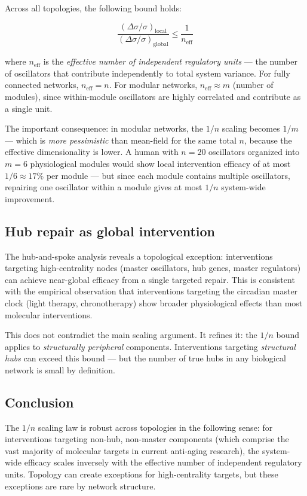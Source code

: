 \documentclass[12pt]{article}
\begin{document}
Across all topologies, the following bound holds:

\begin{equation}
\frac{(\Delta\sigma/\sigma)_\text{local}}{(\Delta\sigma/\sigma)_\text{global}}
\leq \frac{1}{n_\text{eff}}
\end{equation}

where $n_\text{eff}$ is the \emph{effective number of independent regulatory
units} — the number of oscillators that contribute independently to total system
variance. For fully connected networks, $n_\text{eff} = n$. For modular
networks, $n_\text{eff} \approx m$ (number of modules), since within-module
oscillators are highly correlated and contribute as a single unit.

The important consequence: in modular networks, the $1/n$ scaling becomes
$1/m$ — which is \emph{more pessimistic} than mean-field for the same total
$n$, because the effective dimensionality is lower. A human with $n=20$
oscillators organized into $m=6$ physiological modules would show local
intervention efficacy of at most $1/6 \approx 17\%$ per module — but since
each module contains multiple oscillators, repairing one oscillator within a
module gives at most $1/n$ system-wide improvement.

\subsection{Hub repair as global intervention}

The hub-and-spoke analysis reveals a topological exception: interventions
targeting high-centrality nodes (master oscillators, hub genes, master
regulators) can achieve near-global efficacy from a single targeted repair.
This is consistent with the empirical observation that interventions targeting
the circadian master clock (light therapy, chronotherapy) show broader
physiological effects than most molecular interventions.

This does not contradict the main scaling argument. It refines it: the $1/n$
bound applies to \emph{structurally peripheral} components. Interventions
targeting \emph{structural hubs} can exceed this bound — but the number of true
hubs in any biological network is small by definition.

\subsection{Conclusion}

The $1/n$ scaling law is robust across topologies in the following sense: for
interventions targeting non-hub, non-master components (which comprise the vast
majority of molecular targets in current anti-aging research), the system-wide
efficacy scales inversely with the effective number of independent regulatory
units. Topology can create exceptions for high-centrality targets, but these
exceptions are rare by network structure.
\end{document}
